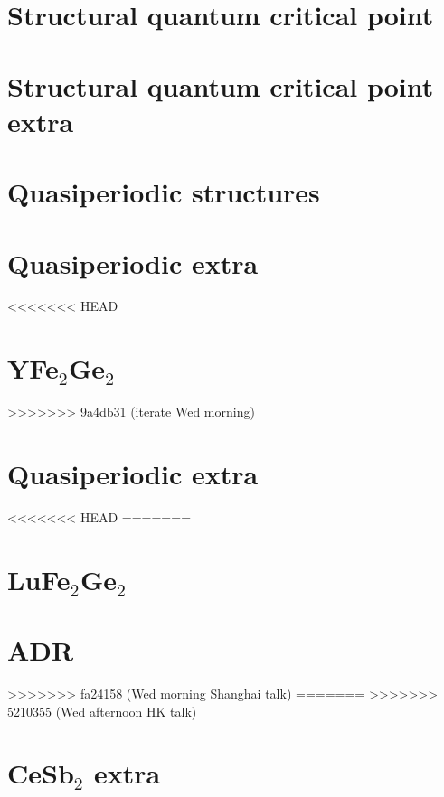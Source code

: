 \section{Structural quantum critical point}

\section{Structural quantum critical point extra}

\section{Quasiperiodic structures}


\section{Quasiperiodic extra}


%
%



<<<<<<< HEAD
\section{YFe$_2$Ge$_2$}
>>>>>>> 9a4db31 (iterate Wed morning)





\section{Quasiperiodic extra}


%
%




<<<<<<< HEAD
=======
\section{LuFe$_2$Ge$_2$}

% 
\section{ADR}

>>>>>>> fa24158 (Wed morning Shanghai talk)
=======
>>>>>>> 5210355 (Wed afternoon HK talk)

\section{CeSb$_2$ extra}




